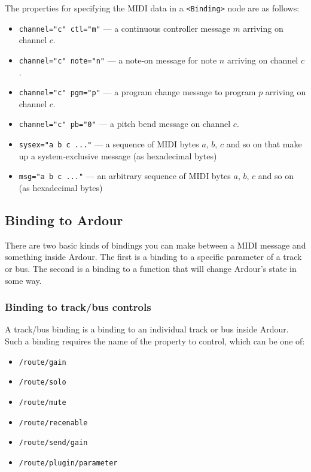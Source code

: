 \documentclass[10pt,a4paper]{book}
\begin{document}
The properties for specifying the MIDI data in a \texttt{<Binding>}
node are as follows:

\begin{itemize}
\item \texttt{channel="c" ctl="m"} --- a continuous controller message $m$ arriving on channel $c$.
\item \texttt{channel="c" note="n"} --- a note-on message for note $n$ arriving on channel $c$.
\item \texttt{channel="c" pgm="p"} --- a program change message to program $p$ arriving on channel $c$.
\item \texttt{channel="c" pb="0"} --- a pitch bend message on channel $c$.
\item \texttt{sysex="a b c ..."} --- a sequence of MIDI bytes $a$, $b$, $c$ and so on that make up a system-exclusive message (as hexadecimal bytes)
\item \texttt{msg="a b c ..."} --- an arbitrary sequence of MIDI bytes $a$, $b$, $c$ and so on (as hexadecimal bytes)
\end{itemize}

\subsection{Binding to Ardour}

There are two basic kinds of bindings you can make between a MIDI
message and something inside Ardour. The first is a binding to a
specific parameter of a track or bus. The second is a binding to a
function that will change Ardour's state in some way. 


\subsubsection{Binding to track/bus controls}

A track/bus binding is a binding to an individual track or bus inside
Ardour.  Such a binding requires the name of the property to control,
which can be one of:

\begin{itemize}
\item \texttt{/route/gain}
\item \texttt{/route/solo}
\item \texttt{/route/mute}
\item \texttt{/route/recenable}
\item \texttt{/route/send/gain}
\item \texttt{/route/plugin/parameter}
\end{itemize}
\end{document}
